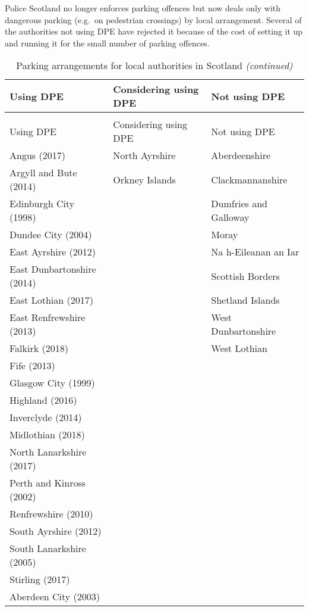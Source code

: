 \documentclass[
  12pt,
]{article}
\begin{document}
Police Scotland no longer enforces parking offences but now deals only with dangerous parking (e.g.~on pedestrian crossings) by local arrangement. Several of the authorities not using DPE have rejected it because of the cost of setting it up and running it for the small number of parking offences.

\begingroup\fontsize{10}{12}\selectfont

\begin{longtable}[t]{lll}
\caption{\label{tab:dpe}Parking arrangements for local authorities in Scotland}\\
\toprule
Using DPE & Considering using DPE & Not using DPE\\
\midrule
\endfirsthead
\caption[]{\label{tab:dpe}Parking arrangements for local authorities in Scotland \textit{(continued)}}\\
\toprule
Using DPE & Considering using DPE & Not using DPE\\
\midrule
\endhead

\endfoot
\bottomrule
\endlastfoot
Angus (2017) & North Ayrshire & Aberdeenshire\\
Argyll and Bute (2014) & Orkney Islands & Clackmannanshire\\
Edinburgh City (1998) &  & Dumfries and Galloway\\
Dundee City (2004) &  & Moray\\
East Ayrshire (2012) &  & Na h-Eileanan an Iar\\
East Dunbartonshire (2014) &  & Scottish Borders\\
East Lothian (2017) &  & Shetland Islands\\
East Renfrewshire (2013) &  & West Dunbartonshire\\
Falkirk (2018) &  & West Lothian\\
Fife (2013) &  & \\
Glasgow City (1999) &  & \\
Highland (2016) &  & \\
Inverclyde (2014) &  & \\
Midlothian (2018) &  & \\
North Lanarkshire (2017) &  & \\
Perth and Kinross (2002) &  & \\
Renfrewshire (2010) &  & \\
South Ayrshire (2012) &  & \\
South Lanarkshire (2005) &  & \\
Stirling (2017) &  & \\
Aberdeen City (2003) &  & \\*
\end{longtable}
\endgroup{}
\end{document}
